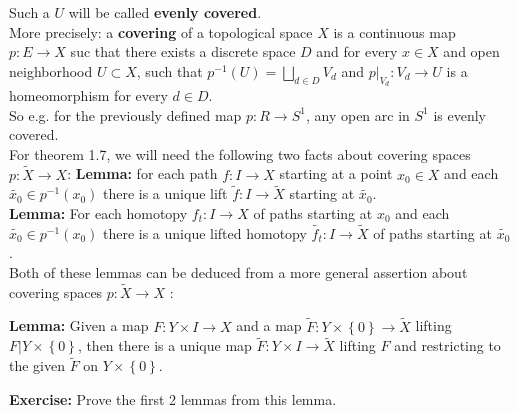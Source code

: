 \documentclass[a4paper]{article}
\begin{document}
Such a $U$ will be called \textbf{evenly covered}.\\
\linebreak
More precisely: a \textbf{covering} of a topological space $X$ is a continuous
map
$p  \colon E \to X$ suc that there exists a discrete space $D$ and for every
$x \in X$ and open neighborhood $U \subset X$, such that
$p^{-1}\left( U \right)  = \bigsqcup_{d \in D} V_d$ and 
$p|_{V_d}  \colon V_d \to U$ is a homeomorphism for every $d \in D$.\\
\linebreak
So e.g. for the previously defined map $p  \colon R\to S^{1}$, any open arc in
$S^{1}$ is evenly covered. \\
\linebreak
For theorem 1.7, we will need the following two facts about covering spaces
 $p  \colon \tilde{X} \to X$:
\textbf{Lemma:} for each path $f  \colon I \to X$ starting at a point $x_0 \in
X$ and each $\tilde{x_0} \in p^{-1}\left( x_0 \right) $ there is a unique lift
$\tilde{f}  \colon I \to \tilde{X}$ starting at $\tilde{x_0}$.\\
\linebreak
\textbf{Lemma:} For each homotopy $f_t  \colon I \to X$ of paths starting at
$x_0$ and each $\tilde{x_0} \in p^{-1}(x_0)$ there is a unique lifted homotopy
$\tilde{f_t}  \colon I \to \tilde{X}$ of paths starting at $\tilde{x_0}$.\\
\linebreak
Both of these lemmas can be deduced from a more general assertion about
covering spaces
$p  \colon \tilde{X} \to X$ :\\
\begin{center}
    \textbf{Lemma:} Given a map $F  \colon Y \times I \to X$ and a map
    $\tilde{F}  \colon Y \times \left\{ 0 \right\}  \to \tilde{X}$ lifting
    $F | Y \times \left\{ 0 \right\} $, then there is a unique map
    $\tilde{F}  \colon Y \times I \to \tilde{X}$ lifting $F$ and restricting to
    the given $\tilde{F}$ on $Y \times \left\{ 0 \right\} $.
\end{center}

\textbf{Exercise:} Prove the first 2 lemmas from this lemma.\\
\linebreak
\end{document}
